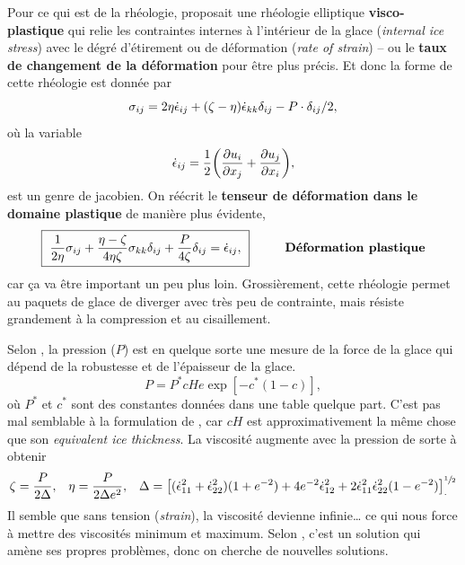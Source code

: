 \documentclass[10pt]{article}
\numberwithin{equation}{section}
\begin{document}
Pour ce qui est de la rhéologie, \Textcite{hibler1979dynamic} proposait une rhéologie elliptique \textbf{visco-plastique} qui relie les contraintes internes à l'intérieur de la glace (\emph{internal ice stress}) avec le dégré  d'étirement ou de déformation (\emph{rate of strain}) -- ou le \textbf{taux de changement de la déformation} pour être plus précis. 
Et donc la forme de cette rhéologie est donnée par
\begin{equation}
\label{eq:org4a5c96e}
   \sigma_{ij} = 2 \eta \dot{\epsilon}_{ij} + \qty(\zeta - \eta) \dot{\epsilon}_{kk} \delta_{ij} - P \cdot\delta_{ij}/2,
\end{equation}
où la variable
\begin{equation}
   \dot{\epsilon}_{ij} = \frac{1}{2} \qty(\pdv{u_i}{x_j}+\pdv{u_j}{x_i}),
\end{equation}
est un genre de jacobien.
On réécrit le \textbf{tenseur de déformation dans le domaine plastique} de manière plus évidente,
\begin{equation}
\label{eq:org934d431}
   \boxed{\ \frac{1}{2\eta} \sigma_{ij} + \frac{\eta-\zeta}{4\eta\zeta} \sigma_{kk}\delta_{ij} + \frac{P}{4\zeta} \delta_{ij} = \dot{\epsilon}_{ij},\ }\hspace{1cm}\text{\textbf{Déformation plastique}}
\end{equation}
car ça va être important un peu plus loin.
Grossièrement, cette rhéologie permet au paquets de glace de diverger avec très peu de contrainte, mais résiste grandement à la compression et au cisaillement.\bigskip

Selon \Textcite{hunke1997elastic}, la pression (\(P\)) est en quelque sorte une mesure de la force de la glace qui dépend de la robustesse et de l'épaisseur de la glace.
\begin{equation}
   P = P^\ast c He \exp[-c^\ast(1-c)],
\end{equation}
où \(P^\ast\) et \(c^\ast\) sont des constantes données dans une table quelque part.
C'est pas mal semblable à la formulation de \Textcite{hibler1979dynamic}, car \(cH\) est approximativement la même chose que son \emph{equivalent ice thickness}.
La viscosité augmente avec la pression de sorte à obtenir
\begin{align}
   \zeta = \frac{P}{2\Delta}, && \eta = \frac{P}{2\Delta e^2}, && \Delta = \qty[(\dot{\epsilon}^2_{11} + \dot{\epsilon}^2_{22})(1 + e^{-2}) + 4 e^{-2}\dot{\epsilon}^2_{12} + 2 \dot{\epsilon}^2_{11}\dot{\epsilon}^2_{22}(1-e^{-2})]^{\sfrac{1}{2}}_.
\end{align}
Il semble que sans tension (\emph{strain}), la viscosité devienne infinie\ldots{} ce qui nous force à mettre des viscosités minimum et maximum.
Selon \citeauthor*{hunke1997elastic}, c'est un solution qui amène ses propres problèmes, donc on cherche de nouvelles solutions.\bigskip
\end{document}
